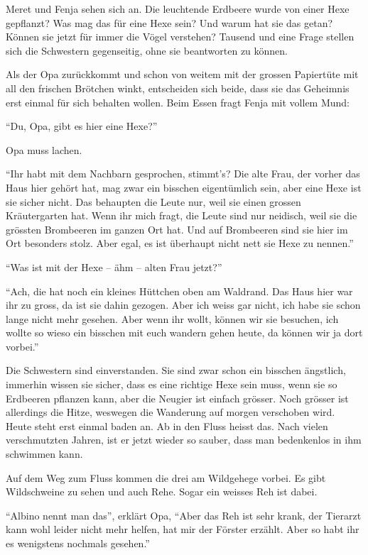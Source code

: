 Meret und Fenja sehen sich an. Die leuchtende Erdbeere wurde von einer Hexe gepflanzt? Was mag das für eine Hexe sein? Und warum hat sie das getan? Können sie jetzt für immer die Vögel verstehen? Tausend und eine Frage stellen sich die Schwestern gegenseitig, ohne sie beantworten zu können.

Als der Opa zurückkommt und schon von weitem mit der grossen Papiertüte mit all den frischen Brötchen winkt, entscheiden sich beide, dass sie das Geheimnis erst einmal für sich behalten wollen. Beim Essen fragt Fenja mit vollem Mund:

\enquote{Du, Opa, gibt es hier eine Hexe?}

Opa muss lachen.

\enquote{Ihr habt mit dem Nachbarn gesprochen, stimmt's? Die alte Frau, der vorher das Haus hier gehört hat, mag zwar ein bisschen eigentümlich sein, aber eine Hexe ist sie sicher nicht. Das behaupten die Leute nur, weil sie einen grossen Kräutergarten hat. Wenn ihr mich fragt, die Leute sind nur neidisch, weil sie die grössten Brombeeren im ganzen Ort hat. Und auf Brombeeren sind sie hier im Ort besonders stolz. Aber egal, es ist überhaupt nicht nett sie Hexe zu nennen.}

\enquote{Was ist mit der Hexe -- ähm -- alten Frau jetzt?}

\enquote{Ach, die hat noch ein kleines Hüttchen oben am Waldrand. Das Haus hier war ihr zu gross, da ist sie dahin gezogen. Aber ich weiss gar nicht, ich habe sie schon lange nicht mehr gesehen. Aber wenn ihr wollt, können wir sie besuchen, ich wollte so wieso ein bisschen mit euch wandern gehen heute, da können wir ja dort vorbei.}

Die Schwestern sind einverstanden. Sie sind zwar schon ein bisschen ängstlich, immerhin wissen sie sicher, dass es eine richtige Hexe sein muss, wenn sie so Erdbeeren pflanzen kann, aber die Neugier ist einfach grösser. Noch grösser ist allerdings die Hitze, weswegen die Wanderung auf morgen verschoben wird. Heute steht erst einmal baden an. Ab in den Fluss heisst das. Nach vielen verschmutzten Jahren, ist er jetzt wieder so sauber, dass man bedenkenlos in ihm schwimmen kann.

Auf dem Weg zum Fluss kommen die drei am Wildgehege vorbei. Es gibt Wildschweine zu sehen und auch Rehe. Sogar ein weisses Reh ist dabei. 

\enquote{Albino nennt man das}, erklärt Opa, \enquote{Aber das Reh ist sehr krank, der Tierarzt kann wohl leider nicht mehr helfen, hat mir der Förster erzählt. Aber so habt ihr es wenigstens nochmals gesehen.}

